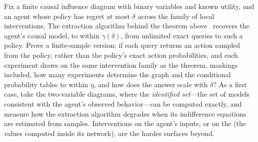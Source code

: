 \begin{openproblem}
Fix a finite causal influence diagram with binary variables and known utility, and an agent whose policy has regret at most $\delta$ across the family of local interventions. The extraction algorithm behind the theorem above~\cite{richens2024} recovers the agent's causal model, to within $\gamma(\delta)$, from unlimited exact queries to such a policy. Prove a finite-sample version: if each query returns an action sampled from the policy, rather than the policy's exact action probabilities, and each experiment draws on the same intervention family as the theorem, maskings included, how many experiments determine the graph and the conditional probability tables to within $\eta$, and how does the answer scale with $\delta$? As a first case, take the two-variable diagrams, where the \emph{identified set}---the set of models consistent with the agent's observed behavior---can be computed exactly, and measure how the extraction algorithm degrades when its indifference equations are estimated from samples. Interventions on the agent's inputs, or on the  (the values computed inside its network), are the harder surfaces beyond.
\end{openproblem}

